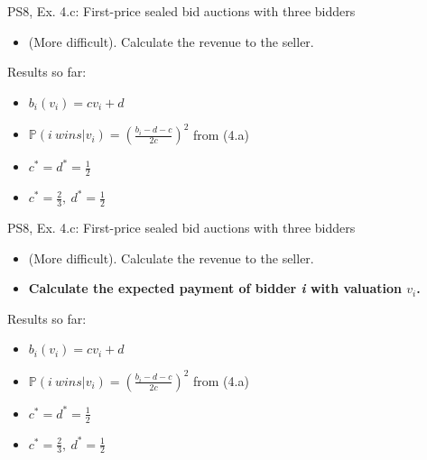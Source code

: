 \begin{frame}{PS8, Ex. 4.c: First-price sealed bid auctions with three bidders}
    \begin{itemize}
      \item[(c)] (More difficult). Calculate the revenue to the seller.
    \end{itemize}
    \vspace{-8pt}
    \begin{multicols}{2}
      \vfill\null\columnbreak
      Results so far:
      \vspace{-6pt}
      \begin{itemize}
        \item[($*$)] $b_i(v_i) = cv_i+d$
        \item[($\dagger$)] $\mathbb{P}(i\ wins|v_i)=\left(\frac{b_i-d-c}{2c}\right)^2$ from (4.a)
        \item[(3.a)] $c^*=d^*=\frac{1}{2}$
        \item[(4.a)] $c^*=\frac{2}{3},\ d^*=\frac{1}{2}$
      \end{itemize}
      \vfill\null
    \end{multicols}
    \vfill\null
\end{frame}
\begin{frame}{PS8, Ex. 4.c: First-price sealed bid auctions with three bidders}
    \begin{itemize}
      \item[(c)] (More difficult). Calculate the revenue to the seller.
    \end{itemize}
    \vspace{-8pt}
    \begin{multicols}{2}
      \begin{itemize}
        \item[\nth{1} step:] \textbf{Calculate the expected payment of bidder \textit{i} with valuation $v_i$.}
      \end{itemize}
      \vfill\null\columnbreak
      Results so far:
      \vspace{-6pt}
      \begin{itemize}
        \item[($*$)] $b_i(v_i) = cv_i+d$
        \item[($\dagger$)] $\mathbb{P}(i\ wins|v_i)=\left(\frac{b_i-d-c}{2c}\right)^2$ from (4.a)
        \item[(3.a)] $c^*=d^*=\frac{1}{2}$
        \item[(4.a)] $c^*=\frac{2}{3},\ d^*=\frac{1}{2}$
      \end{itemize}
      \vfill\null
    \end{multicols}
    \vfill\null
\end{frame}
